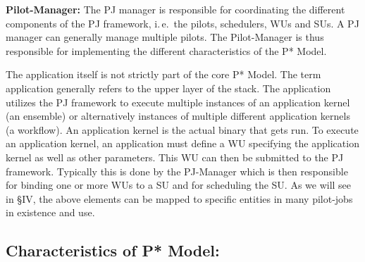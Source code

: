 \documentclass[conference,final]{IEEEtran}
\newcommand{\upp}{\vspace*{-0.5em}}
\begin{document}
\begin{compactitem}
\item \textbf{Pilot-Manager:} The PJ manager is responsible for
  coordinating the different components of the PJ framework, i.\,e.\ the
  pilots, schedulers, WUs and SUs. A PJ manager can generally manage multiple
  pilots.   The Pilot-Manager is thus responsible for
  implementing the different characteristics of the P*
  Model.  
\end{compactitem}

The application itself is not strictly part of the core P* Model. The
term application generally refers to the upper layer of the stack. The
application utilizes the PJ framework to execute multiple instances of
an application kernel (an ensemble) or alternatively instances of
multiple different application kernels (a workflow). An application
kernel is the actual binary that gets run.  To execute an application
kernel, an application must define a WU specifying the application
kernel as well as other parameters. This WU can then be submitted to
the PJ framework. Typically this is done by the PJ-Manager which is
then responsible for binding one or more WUs to a SU and for
scheduling the SU.	
As we will see in \S{IV}, the above elements can be mapped to specific
entities in many pilot-jobs in existence and use.

 

% 
% 


\subsection{Characteristics of P* Model:\upp\upp}
\label{sec:p_star_elements}
\end{document}
